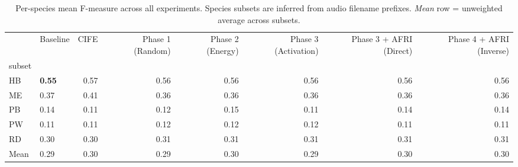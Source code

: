 \begin{table}
\centering
\caption{Per-species mean F-measure across all experiments. Species subsets are inferred from audio filename prefixes. \emph{Mean} row = unweighted average across subsets.}
\label{tab:per_species}
\begin{tabular}{llrrrrrr}
\toprule
{} &       Baseline &  CIFE &  Phase 1 (Random) &  Phase 2 (Energy) &  Phase 3 (Activation) &  Phase 3 + AFRI (Direct) &  Phase 4 + AFRI (Inverse) \\
subset &                &       &                   &                   &                       &                          &                           \\
\midrule
HB     &  \textbf{0.55} &  0.57 &              0.56 &              0.56 &                  0.56 &                     0.56 &                      0.56 \\
ME     &           0.37 &  0.41 &              0.36 &              0.36 &                  0.36 &                     0.36 &                      0.36 \\
PB     &           0.14 &  0.11 &              0.12 &              0.15 &                  0.11 &                     0.14 &                      0.14 \\
PW     &           0.11 &  0.11 &              0.12 &              0.12 &                  0.12 &                     0.11 &                      0.11 \\
RD     &           0.30 &  0.30 &              0.31 &              0.31 &                  0.31 &                     0.31 &                      0.31 \\
Mean   &           0.29 &  0.30 &              0.29 &              0.30 &                  0.29 &                     0.30 &                      0.30 \\
\bottomrule
\end{tabular}
\end{table}
